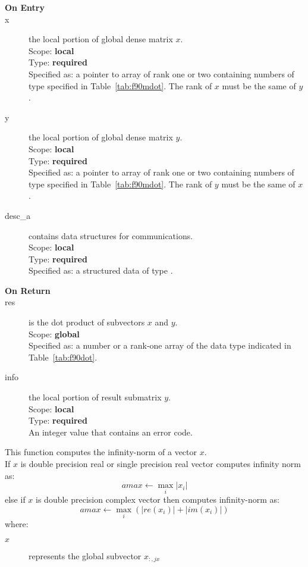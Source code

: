 \begin{description}
\item[\bf On Entry]
\item[x] the local portion of global dense matrix
$x$. \\
Scope: {\bf local} \\
Type: {\bf required} \\
Specified as: a pointer to array of rank one or two
containing numbers of type specified in
Table~\ref{tab:f90mdot}. The rank of $x$ must be the same of $y$. 
\item[y] the local portion of global dense matrix
$y$. \\
Scope: {\bf local} \\
Type: {\bf required} \\
Specified as: a pointer to array of rank one or two
containing numbers of type specified in
Table~\ref{tab:f90mdot}. The rank of $y$ must be the same of $x$. 
\item[desc\_a] contains data structures for communications.\\
Scope: {\bf local} \\
Type: {\bf required}\\
Specified as: a structured data of type \descdata.
\item[\bf On Return] 
\item[res] is the dot product of subvectors $x$ and $y$.\\
Scope: {\bf global} \\
Specified as: a number or a rank-one array  of the data type indicated
in Table~\ref{tab:f90dot}. 
\item[info] the local portion of result submatrix $y$.\\
Scope: {\bf local} \\
Type: {\bf required} \\
An integer value that contains an error code. 
\end{description}

%
%



This function computes 
 the infinity-norm of a vector $x$.\\
If $x$ is double precision real or single precision real vector
computes infinity norm as:
\[ amax \leftarrow \max_i |x_i|\]
else if $x$ is double precision complex vector then computes infinity-norm  as:
\[ amax \leftarrow \max_i {(|re(x_i)| + |im(x_i)|)}\]
where:
\begin{description}
\item[$x$] represents the global subvector $x_{:,jx}$
\end{description}

